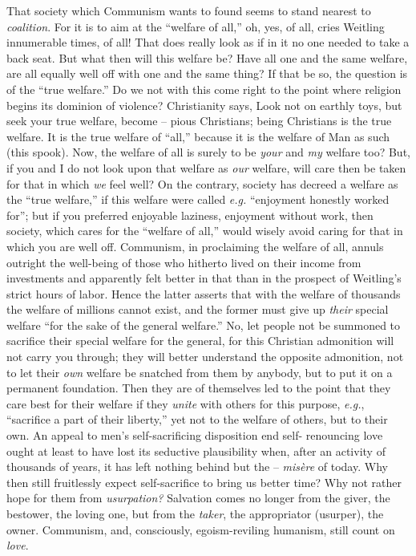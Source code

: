 \documentclass[12pt,a4paper]{book}
\begin{document}
That society which Communism wants to found seems to stand nearest to 
\textit{coalition}. For it is to aim at the ``welfare of all,'' oh, yes, of 
all, cries Weitling innumerable times, of all! That does really look as if in 
it no one needed to take a back seat. But what then will this welfare be? Have 
all one and the same welfare, are all equally well off with one and the same 
thing? If that be so, the question is of the ``true welfare.'' Do we not 
with this come right to the point where religion begins its dominion of 
violence? Christianity says, Look not on earthly toys, but seek your true 
welfare, become -- pious Christians; being Christians is the true welfare. It 
is the true welfare of ``all,'' because it is the welfare of Man as such 
(this spook). Now, the welfare of all is surely to be \textit{your} and 
\textit{my} welfare too? But, if you and I do not look upon that welfare as 
\textit{our} welfare, will care then be taken for that in which \textit{we} 
feel well? On the contrary, society has decreed a welfare as the ``true 
welfare,'' if this welfare were called \textit{e.g.} ``enjoyment honestly 
worked for''; but if you preferred enjoyable laziness, enjoyment without 
work, then society, which cares for the ``welfare of all,'' would wisely 
avoid caring for that in which you are well off. Communism, in proclaiming the 
welfare of all, annuls outright the well-being of those who hitherto lived on 
their income from investments and apparently felt better in that than in the 
prospect of Weitling's strict hours of labor. Hence the latter asserts that 
with the welfare of thousands the welfare of millions cannot exist, and the 
former must give up \textit{their} special welfare ``for the sake of the 
general welfare.'' No, let people not be summoned to sacrifice their special 
welfare for the general, for this Christian admonition will not carry you 
through; they will better understand the opposite admonition, not to let their 
\textit{own} welfare be snatched from them by anybody, but to put it on a 
permanent foundation. Then they are of themselves led to the point that they 
care best for their welfare if they \textit{unite} with others for this 
purpose, \textit{e.g.}, ``sacrifice a part of their liberty,'' yet not to 
the welfare of others, but to their own. An appeal to men's self-sacrificing 
disposition end self- renouncing love ought at least to have lost its 
seductive plausibility when, after an activity of thousands of years, it has 
left nothing behind but the -- \textit{mis\`ere} of today. Why then still 
fruitlessly expect self-sacrifice to bring us better time? Why not rather hope 
for them from \textit{usurpation?} Salvation comes no longer from the giver, 
the bestower, the loving one, but from the \textit{taker}, the appropriator 
(usurper), the owner. Communism, and, consciously, egoism-reviling humanism, 
still count on \textit{love}.
\end{document}
